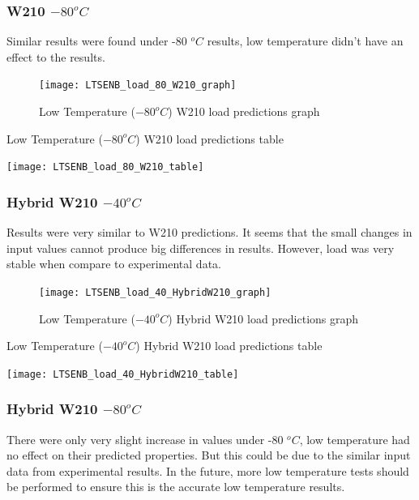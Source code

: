 \documentclass[numbers=noendperiod,chapterprefix=on]{icldt} %
\begin{document}
{\subsubsection{W210 $ -80 ^{o}C$}
Similar results were found under -80 $^oC$ results, low temperature didn't have an effect to the results.

\begin{figure}[!hp]
  \centering
  \texttt{[image: LTSENB\_load\_80\_W210\_graph]}\label{LTSENB_load_80_W210_graph}
  \caption{Low Temperature ($ -80 ^{o}C$) W210 load predictions graph}
  \end{figure}
 \FloatBarrier
 
 \begin{table}
    \centering
    \caption{Low Temperature ($ -80 ^{o}C$) W210 load predictions table}\label{LTSENB_load_80_W210_table}
    \texttt{[image: LTSENB\_load\_80\_W210\_table]}
    \end{table}
    \FloatBarrier
     
\subsubsection{ Hybrid W210 $ -40 ^{o}C$}
Results were very similar to W210 predictions. It seems that the small changes in input values cannot produce big differences in results. However, load was very stable when compare to experimental data.

\begin{figure}[!hp]
  \centering
  \texttt{[image: LTSENB\_load\_40\_HybridW210\_graph]}\label{LTSENB_load_40_HybridW210_graph}
  \caption{Low Temperature ($ -40 ^{o}C$) Hybrid W210 load predictions graph}
  \end{figure}
 \FloatBarrier
 
 \begin{table}
    \centering
    \caption{Low Temperature ($ -40 ^{o}C$) Hybrid W210 load predictions table}\label{LTSENB_load_40_HybridW210_table}
    \texttt{[image: LTSENB\_load\_40\_HybridW210\_table]}
    \end{table}
    \FloatBarrier
     
\subsubsection{\space Hybrid W210 $ -80 ^{o}C$}
There were only very slight increase in values under -80 $^oC$, low temperature had no effect on their predicted properties. But this could be due to the similar input data from experimental results. In the future, more low temperature tests should be performed to ensure this is the accurate low temperature results.

}
\end{document}
